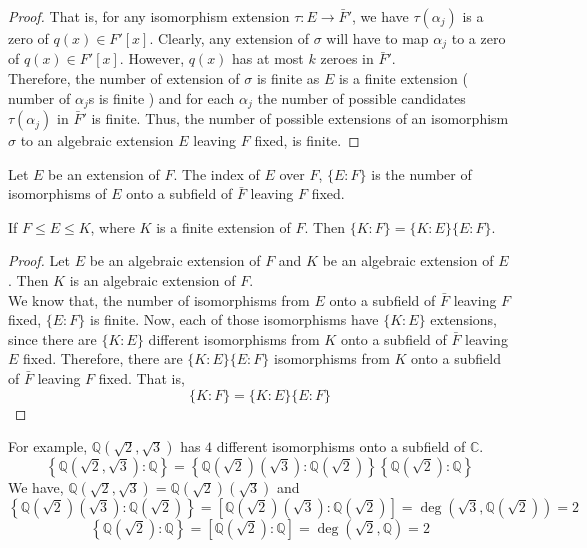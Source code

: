 \begin{proof}
	That is, for any isomorphism extension $\tau : E \to \bar{F}'$, we have $\tau(\alpha_j)$ is a zero of $q(x) \in F'[x]$.
	Clearly, any extension of $\sigma$ will have to map $\alpha_j$ to a zero of $q(x) \in F'[x]$.
	However, $q(x)$ has at most $k$ zeroes in $\bar{F}'$.\\

	Therefore, the number of extension of $\sigma$ is finite as $E$ is a finite extension ( number of $\alpha_j$s is finite ) and for each $\alpha_j$ the number of possible candidates $\tau(\alpha_j)$ in $\bar{F}'$ is finite.
	Thus, the number of possible extensions of an isomorphism $\sigma$ to an algebraic extension $E$ leaving $F$ fixed, is finite.
\end{proof}

\begin{definition}[index]
	Let $E$ be an extension of $F$.
	The index of $E$ over $F$, $\{E:F\}$ is the number of isomorphisms of $E$ onto a subfield of $\bar{F}$ leaving $F$ fixed.
\end{definition}

\begin{corollary}
	If $F \le E \le K$, where $K$ is a finite extension of $F$.
	Then $\{ K : F \} = \{ K : E \} \{ E : F \}$.
\end{corollary}
\begin{proof}
	Let $E$ be an algebraic extension of $F$ and $K$ be an algebraic extension of $E$.
	Then $K$ is an algebraic extension of $F$.\\

	We know that, the number of isomorphisms from $E$ onto a subfield of $\bar{F}$ leaving $F$ fixed, $\{ E : F \}$ is finite.
	Now, each of those isomorphisms have $\{ K : E \}$ extensions, since there are $\{ K : E \}$ different isomorphisms from $K$ onto a subfield of $\bar{F}$ leaving $E$ fixed.
	Therefore, there are $\{ K : E \}\{ E : F\}$ isomorphisms from $K$ onto a subfield of $\bar{F}$ leaving $F$ fixed.
	That is,
	\[ \{ K : F \} = \{ K : E \} \{ E : F \} \]
\end{proof}
For example, $\mathbb{Q}(\sqrt{2},\sqrt{3})$ has $4$ different isomorphisms onto a subfield of $\mathbb{C}$.
\[ \left\{ \mathbb{Q}(\sqrt{2},\sqrt{3}) : \mathbb{Q} \right\} = \left\{ \mathbb{Q}(\sqrt{2})(\sqrt{3}) : \mathbb{Q}(\sqrt{2}) \right\} \left\{ \mathbb{Q}(\sqrt{2}) : \mathbb{Q}\right\} \]
We have, $\mathbb{Q}(\sqrt{2},\sqrt{3}) = \mathbb{Q}(\sqrt{2})(\sqrt{3})$ and 
\[ \left\{\mathbb{Q}(\sqrt{2})(\sqrt{3}) : \mathbb{Q}(\sqrt{2}) \right\} = \left[ \mathbb{Q}(\sqrt{2})(\sqrt{3}) : \mathbb{Q}(\sqrt{2})\right] = \deg\left(\sqrt{3},\mathbb{Q}(\sqrt{2})\right) = 2 \]
\[ \left\{\mathbb{Q}(\sqrt{2}) : \mathbb{Q} \right\} = \left[ \mathbb{Q}(\sqrt{2}) : \mathbb{Q} \right] = \deg\left(\sqrt{2},\mathbb{Q}\right) = 2 \]

